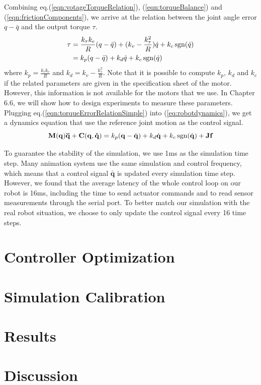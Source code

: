 Combining eq.(\ref{eqn:votageTorqueRelation}), (\ref{eqn:torqueBalance}) and (\ref{eqn:frictionComponents}), we arrive at the relation between the joint angle error $q-\bar{q}$ and the output torque $\tau$.
\begin{align}
\nonumber  \tau & = \frac{k_{\tau}k_e}{R}(q-\bar{q})+(k_v-\frac{k_{\tau}^2}{R})\dot{q}+k_c\operatorname{sgn}(\dot{q})\\
\nonumber & = k_p(q-\bar{q}) + k_d\dot{q} + k_c\operatorname{sgn}(\dot{q})\\
  \label{eqn:torqueErrorRelationSimple}
\end{align}
where $k_p=\frac{k_{\tau}k_e}{R}$ and $k_d=k_v-\frac{k_{\tau}^2}{R}$. Note that it is possible to compute $k_p$, $k_d$ and $k_c$ if the related parameters are given in the specification sheet of the motor. However, this information is not available for the motors that we use. In Chapter 6.6, we will show how to design experiments to measure these parameters. Plugging eq.(\ref{eqn:torqueErrorRelationSimple}) into (\ref{eq:robotdynamics}), we get a dynamics equation that use the reference joint motion as the control signal.
\begin{equation}
\mathbf{M}(\mathbf{q})\mathbf{\ddot{q}}+\mathbf{C}(\mathbf{q},\mathbf{\dot{q}}) = k_p(\mathbf{q}-\bar{\mathbf{q}}) + k_d\dot{\mathbf{q}} + k_c\operatorname{sgn}(\dot{\mathbf{q}})+\mathbf{Jf}
  \label{eqn:robotDynamicsControl}
\end{equation}

To guarantee the stability of the simulation, we use 1ms as the simulation time step. Many animation system use the same simulation and control frequency, which means that a control signal $\bar{\mathbf{q}}$ is updated every simulation time step. However, we found that the average latency of the whole control loop on our robot is 16ms, including the time to send actuator commands and to read sensor measurements through the serial port. To better match our simulation with the real robot situation, we choose to only update the control signal every 16 time steps.

\section{Controller Optimization}
\section{Simulation Calibration}
\section{Results}
\section{Discussion}
